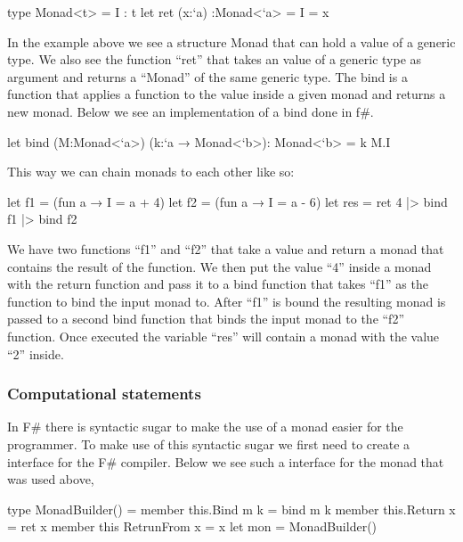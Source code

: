 \begin{code}
	type Monad<t> = {I : t}
	let ret (x:`a) :Monad<`a> = {I = x}
\end{code}

In the example above we see a structure Monad that can hold a value of a generic type. We also see the function “ret” that takes an value of a generic type as argument and returns a “Monad” of the same generic type.
\linebreak
The bind is a function that applies a function to the value inside a given monad and returns a new monad. Below we see an implementation of a bind done in f\#.

\begin{code}
	let bind (M:Monad<`a>) (k:`a → Monad<`b>): Monad<`b> = k M.I
\end{code}

This way we can chain monads to each other like so:

\begin{code}
	let f1 = (fun a → {I = a + 4}) 
	let f2 = (fun a → {I = a - 6})       
	let res = ret 4 |>  bind f1 |> bind f2 
\end{code}

We have two functions “f1” and “f2” that take a value and return a monad that contains the result of the function. We then put the value “4” inside a monad with the return function and pass it to a bind function that takes “f1” as the function to bind the input monad to. After “f1” is bound the resulting monad is passed to a second bind function that binds the input monad to the “f2” function. Once executed the variable “res” will contain a monad with the value “2” inside.

\subsubsection{Computational statements}

In F\# there is syntactic sugar to make the use of a monad easier for the programmer. 
\linebreak
To make use of this syntactic sugar we first need to create a interface for the F\# compiler. Below we see such a interface for the monad that was used above,

\begin{code}
	type MonadBuilder() = 
		member this.Bind m k = bind m k
		member this.Return x = ret x
		member this RetrunFrom x = x
	let mon = MonadBuilder()
\end{code}

